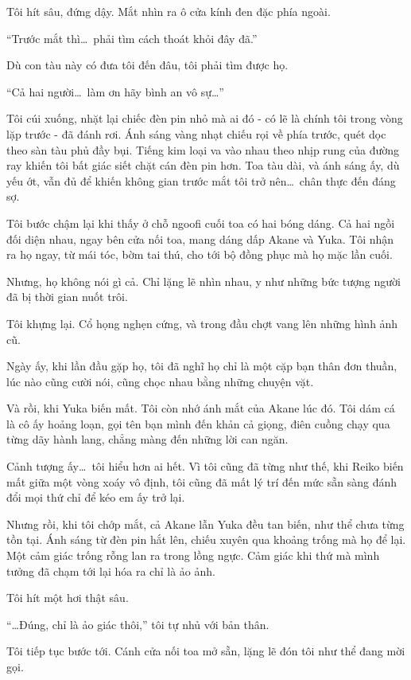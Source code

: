 \documentclass[../main.tex]{subfiles}
\begin{document}
Tôi hít sâu, đứng dậy. Mắt nhìn ra ô cửa kính đen đặc phía ngoài.

``Trước mắt thì\dots\ phải tìm cách thoát khỏi đây đã.''

Dù con tàu này có đưa tôi đến đâu, tôi phải tìm được họ.

``Cả hai người\dots\ làm ơn hãy bình an vô sự\dots''

Tôi cúi xuống, nhặt lại chiếc đèn pin nhỏ mà ai đó - có lẽ là chính tôi trong vòng lặp trước - đã đánh rơi. Ánh sáng vàng nhạt chiếu rọi về phía trước, quét dọc theo sàn tàu phủ đầy bụi. Tiếng kim loại va vào nhau theo nhịp rung của đường ray khiến tôi bất giác siết chặt cán đèn pin hơn. Toa tàu dài, và ánh sáng ấy, dù yếu ớt, vẫn đủ để khiến không gian trước mắt tôi trở nên\dots\ chân thực đến đáng sợ.

Tôi bước chậm lại khi thấy ở chỗ ngoofi cuối toa có hai bóng dáng. Cả hai ngồi đối diện nhau, ngay bên cửa nối toa, mang dáng dấp Akane và Yuka. Tôi nhận ra họ ngay, từ mái tóc, bờm tai thú, cho tới bộ đồng phục mà họ mặc lần cuối.

Nhưng, họ không nói gì cả. Chỉ lặng lẽ nhìn nhau, y như những bức tượng người đã bị thời gian nuốt trôi.

Tôi khựng lại. Cổ họng nghẹn cứng, và trong đầu chợt vang lên những hình ảnh cũ.

Ngày ấy, khi lần đầu gặp họ, tôi đã nghĩ họ chỉ là một cặp bạn thân đơn thuần, lúc nào cũng cười nói, cũng chọc nhau bằng những chuyện vặt.

Và rồi, khi Yuka biến mất. Tôi còn nhớ ánh mắt của Akane lúc đó. Tôi dám cá là cô ấy hoảng loạn, gọi tên bạn mình đến khản cả giọng, điên cuồng chạy qua từng dãy hành lang, chẳng màng đến những lời can ngăn.

Cảnh tượng ấy\dots\ tôi hiểu hơn ai hết. Vì tôi cũng đã từng như thế, khi Reiko biến mất giữa một vòng xoáy vô định, tôi cũng đã mất lý trí đến mức sẵn sàng đánh đổi mọi thứ chỉ để kéo em ấy trở lại.

Nhưng rồi, khi tôi chớp mắt, cả Akane lẫn Yuka đều tan biến, như thể chưa từng tồn tại. Ánh sáng từ đèn pin hắt lên, chiếu xuyên qua khoảng trống mà họ để lại. Một cảm giác trống rỗng lan ra trong lồng ngực. Cảm giác khi thứ mà mình tưởng đã chạm tới lại hóa ra chỉ là ảo ảnh.

Tôi hít một hơi thật sâu.

``\dots Đúng, chỉ là ảo giác thôi,'' tôi tự nhủ với bản thân.

Tôi tiếp tục bước tới. Cánh cửa nối toa mở sẵn, lặng lẽ đón tôi như thể đang mời gọi.
\end{document}
